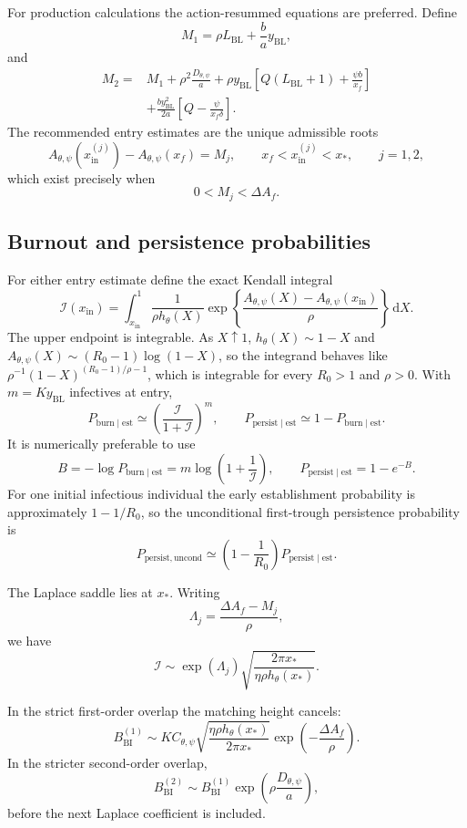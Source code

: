 \documentclass[11pt]{article}
\newcommand{\Rzero}{R_0}
\newcommand{\hth}{h_\theta}
\newcommand{\Apsi}{A_{\theta,\psi}}
\newcommand{\Cpsi}{C_{\theta,\psi}}
\newcommand{\Dpsi}{D_{\theta,\psi}}
\newcommand{\xf}{x_f}
\newcommand{\xs}{x_*}
\newcommand{\yin}{y_{\mathrm{BL}}}
\newcommand{\xin}{x_{\mathrm{in}}}
\newcommand{\dd}{\,\mathrm{d}}
\begin{document}
For production calculations the action-resummed equations are preferred. Define
\[
M_1=\rho L_{\mathrm{BL}}+\frac{b}{a}\yin,
\]
and
\[
\begin{aligned}
M_2={}&M_1+\rho^2\frac{\Dpsi}{a}
+\rho\yin\left[Q(L_{\mathrm{BL}}+1)+\frac{\psi b}{\xf}\right]\\
&+\frac{b\yin^2}{2a}
\left[Q-\frac{\psi}{\xf\delta}\right].
\end{aligned}
\]
The recommended entry estimates are the unique admissible roots
\[
\Apsi\!\left(\xin^{(j)}\right)-\Apsi(\xf)=M_j,
\qquad \xf<\xin^{(j)}<\xs,
\qquad j=1,2,
\]
which exist precisely when
\[
0<M_j<\Delta A_f.
\]

\subsection{Burnout and persistence probabilities}
For either entry estimate define the exact Kendall integral
\[
\mathcal I(\xin)
=\int_{\xin}^{1}
\frac{1}{\rho\hth(X)}
\exp\left\{\frac{\Apsi(X)-\Apsi(\xin)}{\rho}\right\}\dd X.
\]
The upper endpoint is integrable.  As \(X\uparrow1\), \(h_\theta(X)\sim1-X\) and \(A_{\theta,\psi}(X)\sim(R_0-1)\log(1-X)\), so the integrand behaves like \(\rho^{-1}(1-X)^{(R_0-1)/\rho-1}\), which is integrable for every \(R_0>1\) and \(\rho>0\).
With \(m=K\yin\) infectives at entry,
\[
P_{\mathrm{burn}\mid\mathrm{est}}
\simeq\left(\frac{\mathcal I}{1+\mathcal I}\right)^m,
\qquad
P_{\mathrm{persist}\mid\mathrm{est}}
\simeq1-P_{\mathrm{burn}\mid\mathrm{est}}.
\]
It is numerically preferable to use
\[
B=-\log P_{\mathrm{burn}\mid\mathrm{est}}
=m\log\left(1+\frac{1}{\mathcal I}\right),
\qquad
P_{\mathrm{persist}\mid\mathrm{est}}=1-e^{-B}.
\]
For one initial infectious individual the early establishment probability is approximately \(1-1/\Rzero\), so the unconditional first-trough persistence probability is
\[
P_{\mathrm{persist,uncond}}
\simeq\left(1-\frac1{\Rzero}\right)P_{\mathrm{persist}\mid\mathrm{est}}.
\]

The Laplace saddle lies at \(\xs\). Writing
\[
\Lambda_j=\frac{\Delta A_f-M_j}{\rho},
\]
we have
\[
\mathcal I\sim
\exp(\Lambda_j)
\sqrt{\frac{2\pi\xs}{\eta\rho\hth(\xs)}}.
\]

In the strict first-order overlap the matching height cancels:
\[
B_{\mathrm{BI}}^{(1)}
\sim
K\Cpsi
\sqrt{\frac{\eta\rho\hth(\xs)}{2\pi\xs}}
\exp\left(-\frac{\Delta A_f}{\rho}\right).
\]
In the stricter second-order overlap,
\[
B_{\mathrm{BI}}^{(2)}
\sim
B_{\mathrm{BI}}^{(1)}
\exp\left(\rho\frac{\Dpsi}{a}\right),
\]
before the next Laplace coefficient is included.
\end{document}
